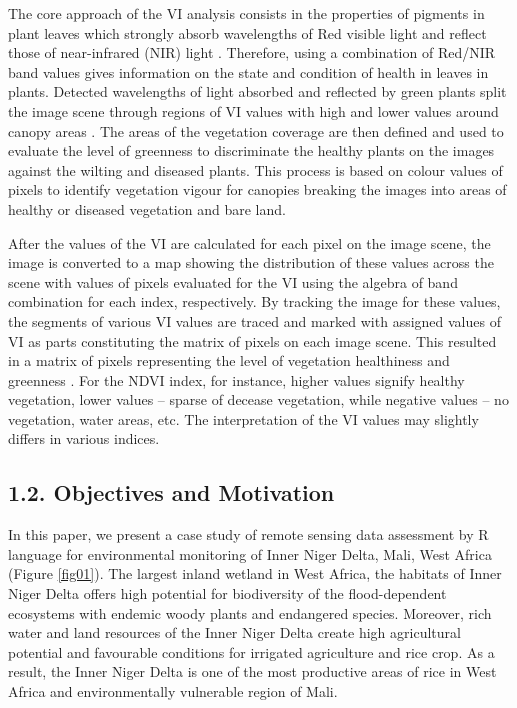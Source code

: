 \documentclass[12pt,a4paper,oneside]{article}
\def \newpar{\vspace{6pt}}
\begin{document}
\newpar The core approach of the VI analysis consists in the properties of pigments in plant leaves which strongly absorb wavelengths of Red visible light and reflect those of near-infrared (NIR) light \citep{rs9050472}. Therefore, using a combination of Red/NIR  band values gives information on the state and condition of health in leaves in plants. Detected wavelengths of light absorbed and reflected by green plants split the image scene through regions of VI values with high and lower values around canopy areas \citep{agronomy9050226,jimaging9050098}. The areas of the vegetation coverage are then defined and used to evaluate the level of greenness to discriminate the healthy plants on the images against the wilting and diseased plants. This process is based on colour values of pixels to identify vegetation vigour for canopies breaking the images into areas of healthy or diseased vegetation and bare land. 

\newpar After the values of the VI are calculated for each pixel on the image scene, the image is converted to a map showing the distribution of these values across the scene with values of pixels evaluated for the VI using the algebra of band combination for each index, respectively. By tracking the image for these values, the segments of various VI values are traced and marked with assigned values of VI as parts constituting the matrix of pixels on each image scene. This resulted in a matrix of pixels representing the level of vegetation healthiness and greenness \citep{agronomy9050238}. For the NDVI index, for instance, higher values signify healthy vegetation, lower values -- sparse of decease vegetation, while negative values -- no vegetation, water areas, etc. The interpretation of the VI values may slightly differs in various indices.

\subsection*{1.2. Objectives and Motivation}

\newpar In this paper, we present a case study of remote sensing data assessment by R language for environmental monitoring of Inner Niger Delta, Mali, West Africa (Figure \ref{fig01}). The largest inland wetland in West Africa, the habitats of Inner Niger Delta offers high potential for biodiversity of the flood-dependent ecosystems with endemic woody plants and endangered species. Moreover, rich water and land resources of the Inner Niger Delta create high agricultural potential and favourable conditions for irrigated agriculture and rice crop. As a result, the Inner Niger Delta is one of the most productive areas of rice in West Africa and environmentally vulnerable region of Mali.
\end{document}
